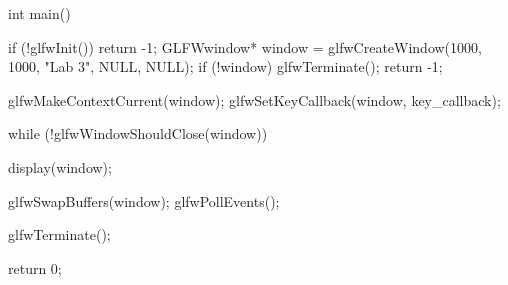 int main()
{
    if (!glfwInit()) {
        return -1;
    }
    GLFWwindow* window = glfwCreateWindow(1000, 1000, "Lab 3", NULL, NULL);
    if (!window) {
        glfwTerminate();
        return -1;
    }

    glfwMakeContextCurrent(window);
    glfwSetKeyCallback(window, key_callback);

    while (!glfwWindowShouldClose(window))
    {
        display(window);
  
        glfwSwapBuffers(window);
        glfwPollEvents();
    }

    glfwTerminate();

    return 0;
}

